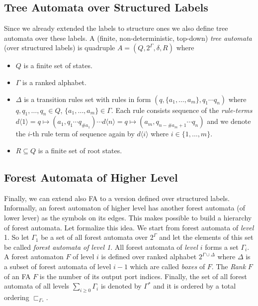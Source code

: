 \subsection{Tree Automata over Structured Labels}

Since we already extended the labels to structure ones we also define tree automata over these labels.
A (finite, non-deterministic, top-down) \emph{tree automata} (over structured labels) is quadruple $A=(Q,2^\Gamma, \delta, R)$ where
\begin{itemize}
	\item $Q$ is a finite set of states.
	\item $\Gamma$ is a ranked alphabet.
	\item $\Delta$ is a transition rules set with rules in form $(q,\{a_1,\ldots,a_m\},q_1 \cdots q_n)$ where $q,q_1,\ldots,q_n \in Q$, $\{a_1,\ldots,a_m\} \in \Gamma$.
	Each rule consists sequence of the \emph{rule-terms} $d\langle 1\rangle = q \mapsto (a_1,q_1 \cdots q_{\#a_1}) \cdots d\langle n\rangle= q \mapsto (a_m,q_{n-\#a_m+1} \cdots q_n)$ and
	we denote the $i$-th rule term of sequence again by $d\langle i\rangle$ where $i \in \{1,\ldots,m\}$.
	\item $R\subseteq Q$ is a finite set of root states.
\end{itemize}

\subsection{Forest Automata of Higher Level}

Finally, we can extend also FA to a version defined over structured labels.
Informally, an forest automaton of higher level has another forest automata (of lower lever) as the symbols on its edges.
This makes possible to build a hierarchy of forest automata.
Let formalize this idea.
We start from forest automata of \emph{level} 1.
So let $\Gamma_1$ be a set of all forest automata over $2^\Gamma$ and let the elements of this set be called \emph{forest automata of level 1}.
All forest automata of \emph{level $i$} forms a set $\Gamma_i$.
A forest automaton $F$ of level $i$ is defined over ranked alphabet $2^{\Gamma \cup \Delta}$ where $\Delta$ is a subset of forest automata of
level $i-1$ which are called \emph{boxes} of $F$.
The \emph{Rank} $F$ of an FA $F$ is the number of its output port indices.
Finally, the set of all forest automata of all levels $\sum_{i \geq 0} \Gamma_i$ is denoted by $\Gamma^{*}$ and it is ordered by a total ordering $\sqsubset_{\Gamma_*}$.

